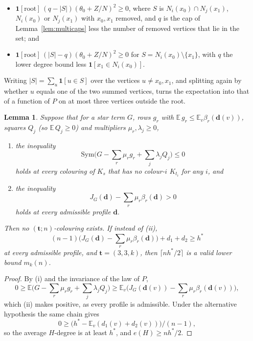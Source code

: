 \documentclass[11pt]{article}
\theoremstyle{spacedplain}
\newtheorem{lemma}[theorem]{Lemma}
\theoremstyle{spaceddef}
\theoremstyle{spacedremark}
\newcommand{\bt}{\mathbf{t}}
\begin{document}
\begin{enumerate}[label=(\alph*)]
\begin{itemize}
\item $\mathbf 1[\text{root}]\,(q-|S|)(\theta_0+Z/N)^2\ge 0$, where $S$ is $N_i(x_0)\cap N_j(x_1)$, $N_i(x_0)$ or $N_j(x_1)$ with $x_0,x_1$ removed, and $q$ is the cap of Lemma~\ref{lem:multicaps} less the number of removed vertices that lie in the set; and
\item $\mathbf 1[\text{root}]\,(|S|-q)(\theta_0+Z/N)^2\ge 0$ for $S=N_i(x_0)\setminus\{x_1\}$, with $q$ the lower degree bound less $\mathbf 1[x_1\in N_i(x_0)]$.
\end{itemize}
Writing $|S|=\sum_u\mathbf 1[u\in S]$ over the vertices $u\ne x_0,x_1$, and splitting again by whether $u$ equals one of the two summed vertices, turns the expectation into that of a function of $P$ on at most three vertices outside the root.
\end{enumerate}

\begin{lemma}\label{lem:flagcert}
Suppose that for a star term $G$, rows $g_r$ with $\mathbb E\,g_r\le\mathbb E_v\beta_r(\mathbf d(v))$, squares $Q_j$ (so $\mathbb E\,Q_j\ge 0$) and multipliers $\mu_r,\lambda_j\ge 0$,
\begin{enumerate}[label=(\roman*)]
\item the inequality
\[
\mathrm{Sym}\Big(G-\sum_r\mu_rg_r+\sum_j\lambda_jQ_j\Big)\le 0
\]
holds at every colouring of $K_s$ that has no colour-$i$ $K_{t_i}$ for any $i$, and
\item the inequality
\[
J_G(\mathbf d)-\sum_r\mu_r\beta_r(\mathbf d)>0
\]
holds at every admissible profile $\mathbf d$.
\end{enumerate}
Then no $(\bt;n)$-colouring exists.
If instead of (ii),
\[
(n-1)\Big(J_G(\mathbf d)-\sum_r\mu_r\beta_r(\mathbf d)\Big)+d_1+d_2\ge h^*
\]
at every admissible profile, and $\bt=(3,3,k)$, then $\lceil nh^*/2\rceil$ is a valid lower bound $m_k(n)$.
\end{lemma}

\begin{proof}
By (i) and the invariance of the law of $P$,
\[
0\ge\mathbb E\Big(G-\sum_r\mu_rg_r+\sum_j\lambda_jQ_j\Big)\ge\mathbb E_v\Big(J_G(\mathbf d(v))-\sum_r\mu_r\beta_r(\mathbf d(v))\Big),
\]
which (ii) makes positive, as every profile is admissible.
Under the alternative hypothesis the same chain gives
\[
0\ge\big(h^*-\mathbb E_v(d_1(v)+d_2(v))\big)/(n-1),
\]
so the average $H$-degree is at least $h^*$, and $e(H)\ge nh^*/2$.
\end{proof}
\end{document}
